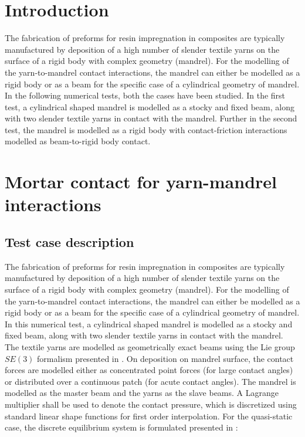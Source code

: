 \section{Introduction}
The fabrication of preforms for resin impregnation in composites are typically manufactured by deposition of a high number of slender textile yarns on the surface of a rigid body with complex geometry (mandrel). For the modelling of the yarn-to-mandrel contact interactions, the mandrel can either be modelled as a rigid body or as a beam for the specific case of a cylindrical geometry of mandrel. In the following numerical tests, both the cases have been studied. In the first test, a cylindrical shaped mandrel is modelled as a stocky and fixed beam, along with two slender textile yarns in contact with the mandrel. Further in the second test, the mandrel is modelled as a rigid body with contact-friction interactions modelled as beam-to-rigid body contact.

\section{Mortar contact for yarn-mandrel interactions}
\subsection{Test case description}
The fabrication of preforms for resin impregnation in composites are typically manufactured by deposition of a high number of slender textile yarns on the surface of a rigid body with complex geometry (mandrel). For the modelling of the yarn-to-mandrel contact interactions, the mandrel can either be modelled as a rigid body or as a beam for the specific case of a cylindrical geometry of mandrel. In this numerical test, a cylindrical shaped mandrel is modelled as a stocky and fixed beam, along with two slender textile yarns in contact with the mandrel.\\
The textile yarns are modelled as geometrically exact beams using the Lie group $SE(3)$ formalism presented in \cite{sonneville2014geometrically}. On deposition on mandrel surface, the contact forces are modelled either as concentrated point forces (for large contact angles) or distributed over a continuous patch (for acute contact angles). The mandrel is modelled as the master beam and the yarns as the slave beams. A Lagrange multiplier shall be used to denote the contact pressure, which is discretized using standard linear shape functions for first order interpolation. For the quasi-static case, the discrete equilibrium system is formulated presented in \cite{bosten2022mortar}:

